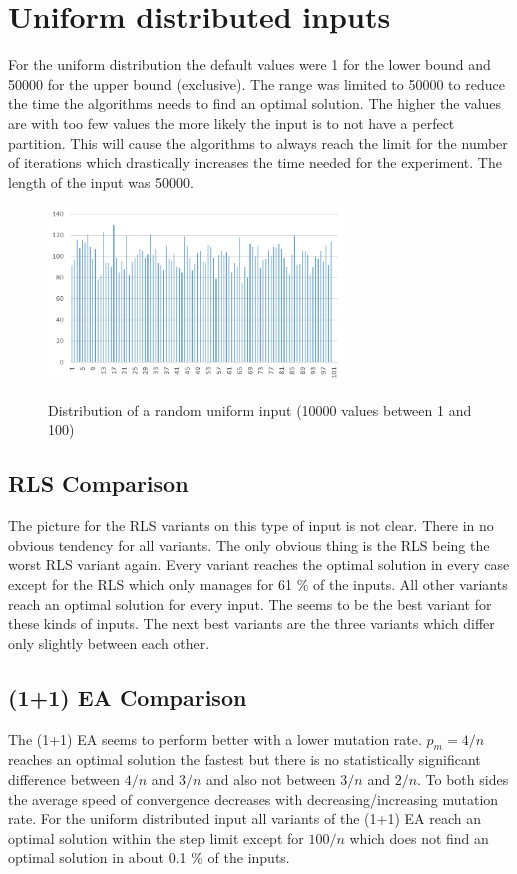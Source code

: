 \section{Uniform distributed inputs}
For the uniform distribution the default values were 1 for the lower bound and 50000 for the upper bound (exclusive).
The range was limited to 50000 to reduce the time the algorithms needs to find an optimal solution.
The higher the values are with too few values the more likely the input is to not have a perfect partition\cite{borgs2001phase}.
This will cause the algorithms to always reach the limit for the number of iterations which drastically increases the time needed for the experiment.
The length of the input was 50000.


\begin{figure}[h]
      \caption{Distribution of a random uniform input (10000 values between 1 and 100)}
      \centering
      \includegraphics[width=0.7\textwidth]{figures/images/numberGenerator/uniformDistributionMin1Max101n10000.png}\label{fig:uniDistExample}
\end{figure}
\subsection{RLS Comparison}

The picture for the RLS variants on this type of input is not clear.
There in no obvious tendency for all variants.
The only obvious thing is the RLS being the worst RLS variant again.
Every variant reaches the optimal solution in every case except for the RLS which only manages for 61 \% of the inputs.
All other variants reach an optimal solution for every input.
The \RLSN[2] seems to be the best variant for these kinds of inputs.
The next best variants are the three \RLSR[s] variants which differ only slightly between each other.

\subsection{(1+1) EA Comparison}

The (1+1) EA seems to perform better with a lower mutation rate.
$p_m=4/n$ reaches an optimal solution the fastest but there is no statistically significant difference between $4/n$ and $3/n$ and also not between $3/n$ and $2/n$.
To both sides the average speed of convergence decreases with decreasing/increasing mutation rate.
For the uniform distributed input all variants of the (1+1) EA reach an optimal solution within the step limit except for $100/n$ which does not find an optimal solution in about 0.1 \% of the inputs.
